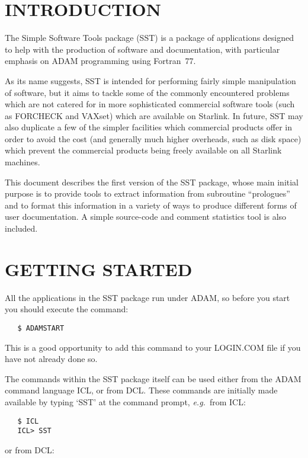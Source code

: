 \section{INTRODUCTION}

The Simple Software Tools package (SST) is a package of applications
designed to help with the production of software and documentation, with
particular emphasis on ADAM programming using Fortran~77. 

As its name suggests, SST is intended for performing fairly simple
manipulation of software, but it aims to tackle some of the
commonly encountered problems which are not catered for in more
sophisticated commercial software tools (such as FORCHECK and VAXset) which
are available on Starlink. 
In future, SST may also duplicate a few of the simpler facilities which
commercial products offer in order to avoid the cost (and generally much
higher overheads, such as disk space) which prevent the commercial products
being freely available on all Starlink machines. 

This document describes the first version of the SST package, whose main
initial purpose is to provide tools to extract information from subroutine
``prologues'' and to format this information in a variety of ways to produce
different forms of user documentation. 
A simple source-code and comment statistics tool is also included.


\section{GETTING STARTED}

All the applications in the SST package run under ADAM, so before you start
you should execute the command: 

\begin{verbatim}
   $ ADAMSTART
\end{verbatim}

This is a good opportunity to add this command to your LOGIN.COM file if you
have not already done so. 

The commands within the SST package itself can be used either from the ADAM
command language ICL, or from DCL. 
These commands are initially made available by typing `SST' at the command
prompt, {\em e.g.}\ from ICL: 

\begin{verbatim}
   $ ICL
   ICL> SST
\end{verbatim}

or from DCL:

